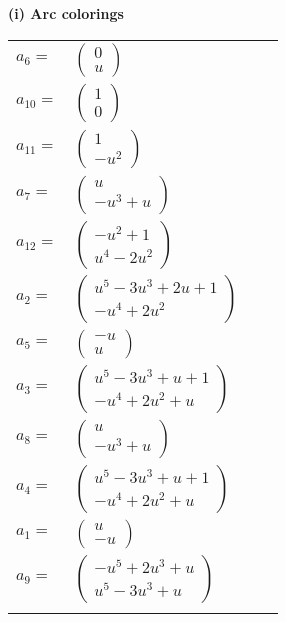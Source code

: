 \documentclass[1p]{elsarticle_modified}
\theoremstyle{definition}
\begin{document}
\flushleft \textbf{(i) Arc colorings}\\
\begin{tabular}{m{7pt} m{180pt} m{7pt} m{180pt} }
\flushright $a_{6}=$&$\begin{pmatrix}0\\u\end{pmatrix}$ \\
\flushright $a_{10}=$&$\begin{pmatrix}1\\0\end{pmatrix}$ \\
\flushright $a_{11}=$&$\begin{pmatrix}1\\- u^2\end{pmatrix}$ \\
\flushright $a_{7}=$&$\begin{pmatrix}u\\- u^3+u\end{pmatrix}$ \\
\flushright $a_{12}=$&$\begin{pmatrix}- u^2+1\\u^4-2 u^2\end{pmatrix}$ \\
\flushright $a_{2}=$&$\begin{pmatrix}u^5-3 u^3+2 u+1\\- u^4+2 u^2\end{pmatrix}$ \\
\flushright $a_{5}=$&$\begin{pmatrix}- u\\u\end{pmatrix}$ \\
\flushright $a_{3}=$&$\begin{pmatrix}u^5-3 u^3+u+1\\- u^4+2 u^2+u\end{pmatrix}$ \\
\flushright $a_{8}=$&$\begin{pmatrix}u\\- u^3+u\end{pmatrix}$ \\
\flushright $a_{4}=$&$\begin{pmatrix}u^5-3 u^3+u+1\\- u^4+2 u^2+u\end{pmatrix}$ \\
\flushright $a_{1}=$&$\begin{pmatrix}u\\- u\end{pmatrix}$ \\
\flushright $a_{9}=$&$\begin{pmatrix}- u^5+2 u^3+u\\u^5-3 u^3+u\end{pmatrix}$\\&\end{tabular}
\end{document}
